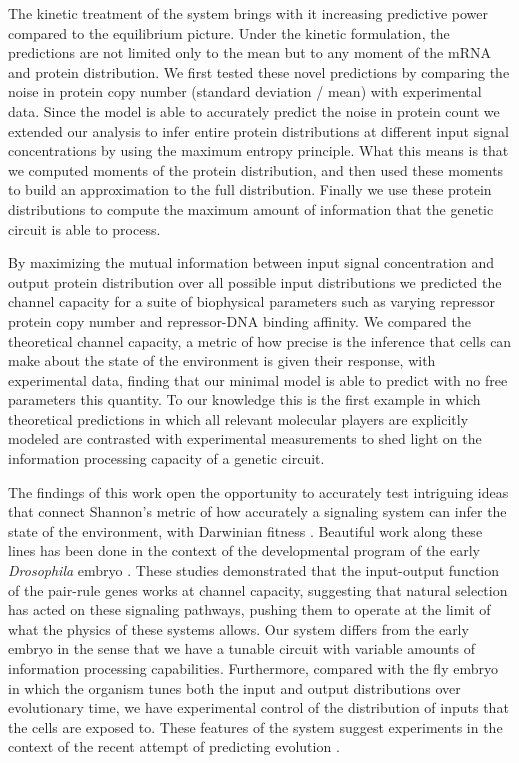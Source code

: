 The kinetic treatment of the system brings with it increasing predictive power
compared to the equilibrium picture. Under the kinetic formulation, the
predictions are not limited only to the mean but to any moment of the mRNA and
protein distribution. We first tested these novel predictions by comparing the
noise in protein copy number (standard deviation / mean) with experimental data.
Since the model is able to accurately predict the noise in protein count we
extended our analysis to infer entire protein distributions at different input
signal concentrations by using the maximum entropy principle. What this means is
that we computed moments of the protein distribution, and then used these
moments to build an approximation to the full distribution. Finally we use these
protein distributions to compute the maximum amount of information that the
genetic circuit is able to process.

By maximizing the mutual information between input signal concentration and
output protein distribution over all possible input distributions we predicted
the channel capacity for a suite of biophysical parameters such as varying
repressor protein copy number and repressor-DNA binding affinity. We compared
the theoretical channel capacity, a metric of how precise is the inference that
cells can make about the state of the environment is given their response, with
experimental data, finding that our minimal model is able to predict with no
free parameters this quantity. To our knowledge this is the first
example in which theoretical predictions in which all relevant molecular players
are explicitly modeled are contrasted with experimental measurements to shed
light on the information processing capacity of a genetic circuit.

The findings of this work open the opportunity to accurately test intriguing
ideas that connect Shannon's metric of how accurately a signaling system can
infer the state of the environment, with Darwinian fitness \cite{Taylor2007a}.
Beautiful work along these lines has been done in the context of the
developmental program of the early {\it Drosophila} embryo \cite{Tkacik2008,
Petkova2016}. These studies demonstrated that the input-output function of the
pair-rule genes works at channel capacity, suggesting that natural selection has
acted on these signaling pathways, pushing them to operate at the limit of what
the physics of these systems allows. Our system differs from the early embryo in
the sense that we have a tunable circuit with variable amounts of information
processing capabilities. Furthermore, compared with the fly embryo in which the
organism tunes both the input and output distributions over evolutionary time,
we have experimental control of the distribution of inputs that the cells are
exposed to. These features of the system suggest experiments in the context of
the recent attempt of predicting evolution \cite{Lassig2017}.

